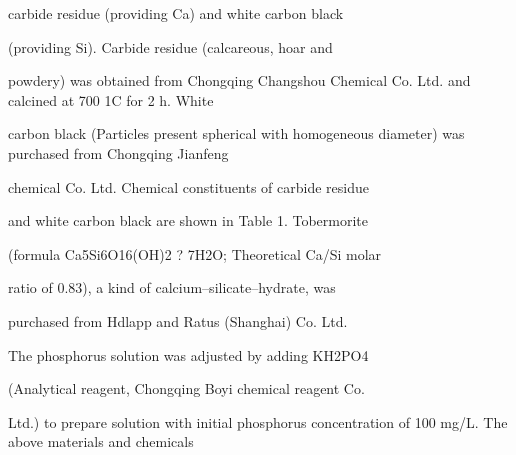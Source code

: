 \documentclass[a4paper,portrait,12pt]{article}
\begin{document}
\begin{flushleft}
carbide residue (providing Ca) and white carbon black
\end{flushleft}


\begin{flushleft}
(providing Si). Carbide residue (calcareous, hoar and
\end{flushleft}


\begin{flushleft}
powdery) was obtained from Chongqing Changshou Chemical Co. Ltd. and calcined at 700 1C for 2 h. White
\end{flushleft}


\begin{flushleft}
carbon black (Particles present spherical with homogeneous diameter) was purchased from Chongqing Jianfeng
\end{flushleft}


\begin{flushleft}
chemical Co. Ltd. Chemical constituents of carbide residue
\end{flushleft}


\begin{flushleft}
and white carbon black are shown in Table 1. Tobermorite
\end{flushleft}


\begin{flushleft}
(formula Ca5Si6O16(OH)2 ? 7H2O; Theoretical Ca/Si molar
\end{flushleft}


\begin{flushleft}
ratio of 0.83), a kind of calcium--silicate--hydrate, was
\end{flushleft}


\begin{flushleft}
purchased from Hdlapp and Ratus (Shanghai) Co. Ltd.
\end{flushleft}


\begin{flushleft}
The phosphorus solution was adjusted by adding KH2PO4
\end{flushleft}


\begin{flushleft}
(Analytical reagent, Chongqing Boyi chemical reagent Co.
\end{flushleft}


\begin{flushleft}
Ltd.) to prepare solution with initial phosphorus concentration of 100 mg/L. The above materials and chemicals
\end{flushleft}
\end{document}
